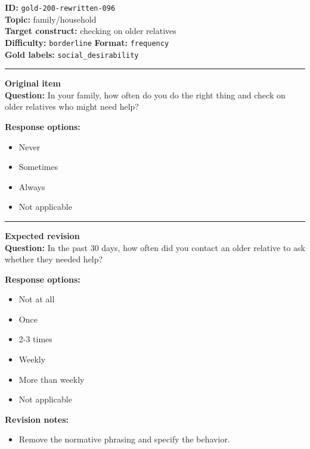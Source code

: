 \documentclass[10pt,a4paper]{article}
\newcommand{\sectionline}{\vspace{0.15em}\hrule\vspace{0.35em}}
\begin{document}
\begin{tcolorbox}[colframe=FlawRed,colback=white,colbacktitle=FlawRed!9,coltitle=black,title={Item 096\hfill Flawed item}]
\textbf{ID:} \texttt{gold-200-rewritten-096}\\
\textbf{Topic:} family/household\\
\textbf{Target construct:} checking on older relatives\\
\textbf{Difficulty:} \texttt{borderline} \quad \textbf{Format:} \texttt{frequency}\\
\textbf{Gold labels:} \texttt{social\_desirability}\\
\sectionline
\textbf{Original item}\\
\textbf{Question:} In your family, how often do you do the right thing and check on older relatives who might need help?
\par\textbf{Response options:}
\begin{itemize}
\item Never
\item Sometimes
\item Always
\item Not applicable
\end{itemize}
\sectionline
\textbf{Expected revision}\\
\textbf{Question:} In the past 30 days, how often did you contact an older relative to ask whether they needed help?
\par\textbf{Response options:}
\begin{itemize}
\item Not at all
\item Once
\item 2-3 times
\item Weekly
\item More than weekly
\item Not applicable
\end{itemize}
\par\textbf{Revision notes:}
\begin{itemize}
\item Remove the normative phrasing and specify the behavior.
\end{itemize}
\end{tcolorbox}
\end{document}
